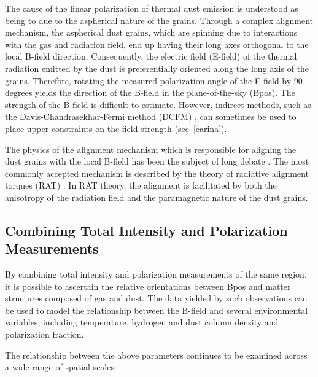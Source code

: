 The cause of the linear polarization of thermal dust emission is understood as being to due to the aspherical nature of the grains. Through a complex alignment mechanism, the aspherical dust grains, which are spinning due to interactions with the gas and radiation field, end up having their long axes orthogonal to the local B-field direction. Consequently, the electric field (E-field) of the thermal radiation emitted by the dust is preferentially oriented along the long axis of the grains. Therefore, rotating the measured polarization angle of the E-field by 90 degrees yields the direction of the B-field in the plane-of-the-sky (\gls{Bpos}). The strength of the B-field is difficult to estimate. However, indirect methods, such as the Davis-Chandrasekhar-Fermi method (DCFM) \citep{chandrasekhar1953magnetic}, can sometimes be used to place upper constraints on the field strength (see~\ref{carina}).

The physics of the alignment mechanism which is responsible for aligning the dust grains with the local B-field has been the subject of long debate \citep{andersson2015interstellar}. The most commonly accepted mechanism is described by the theory of radiative alignment torques (RAT) \citep{lazarian2007radiative}. In RAT theory, the alignment is facilitated by both the anisotropy of the radiation field and the paramagnetic nature of the dust grains.

\subsection{Combining Total Intensity and Polarization Measurements}

By combining total intensity and polarization measurements of the same region, it is possible to ascertain the relative orientations between \gls{Bpos} and matter structures composed of gas and dust. The data yielded by such observations can be used to model the relationship between the B-field and several environmental variables, including temperature, hydrogen and dust column density and polarization fraction.

The relationship between the above parameters continues to be examined across a wide range of spatial scales.

